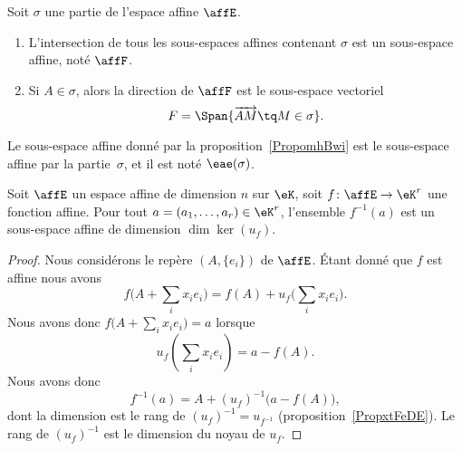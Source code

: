 \begin{proposition}      \label{PropomhBwi}
    Soit \( \sigma\) une partie de l'espace affine \( \affE\).
    \begin{enumerate}
        \item
            L'intersection de tous les sous-espaces affines contenant \( \sigma\) est un sous-espace affine, noté \( \affF\).
        \item
            Si \( A\in \sigma\), alors la direction de \( \affF\) est le sous-espace vectoriel
            \begin{equation}        \label{EqnRAUfg}
                F=\Span\{ \overrightarrow{ AM }\tq M\in \sigma \}.
            \end{equation}
    \end{enumerate}
\end{proposition}
Le sous-espace affine donné par la proposition~\ref{PropomhBwi} est le sous-espace affine  par la partie~\( \sigma\), et il est noté \( \eae(\sigma)\). 

\begin{proposition}     \label{PROPooAKJBooMkmsiV}
    Soit \( \affE\) un espace affine de dimension \( n\) sur \( \eK\), soit \( f\colon \affE\to \eK^r\) une fonction affine. Pour tout \( a=(a_1,\ldots, a_r)\in \eK^r\), l'ensemble \( f^{-1}(a)\) est un sous-espace affine de dimension \( \dim\ker(u_f)\).
\end{proposition}

\begin{proof}
    Nous considérons le repère \( (A,\{ e_i \})\) de \( \affE\). Étant donné que \( f\) est affine nous avons
    \begin{equation}
        f\big( A+\sum_ix_ie_i \big)=f(A)+u_f\big( \sum_ix_ie_i \big).
    \end{equation}
    Nous avons donc \( f\big( A+\sum_ix_ie_i \big)=a\) lorsque
    \begin{equation}
        u_f(\sum_ix_ie_i)=a-f(A).
    \end{equation}
    Nous avons donc
    \begin{equation}
        f^{-1}(a)=A+(u_f)^{-1}\big( a-f(A) \big),
    \end{equation}
    dont la dimension est le rang de \( (u_f)^{-1}=u_{f^{-1}}\) (proposition~\ref{PropxtFeDE}). Le rang de \( (u_f)^{-1}\) est le dimension du noyau de \( u_f\).
\end{proof}

